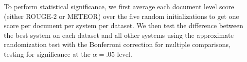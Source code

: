 To perform statistical significance, we first average each document level score
(either ROUGE-2 or METEOR) over the five random initializations to get
one score per document per system per dataset.
We then test the difference between the best system on each dataset and 
all other systems using the approximate randomization test 
\cite{riezler2005some} with the Bonferroni correction for multiple comparisons,
testing for significance at the $\alpha=.05$ level. 


